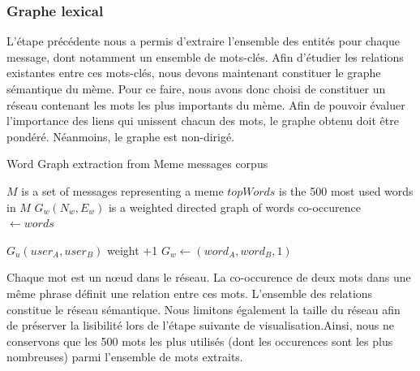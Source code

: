 \subsubsection{Graphe lexical}

    L'étape précédente nous a permis d'extraire l'ensemble des entités pour chaque message, dont notamment un ensemble de mots-clés. Afin d'étudier les relations existantes entre ces mots-clés, nous devons maintenant constituer le graphe sémantique du mème. Pour ce faire, nous avons donc choisi de constituer un réseau contenant les mots les plus importants du mème. Afin de pouvoir évaluer l'importance des liens qui unissent chacun des mots, le graphe obtenu doit être pondéré. Néanmoins, le graphe est non-dirigé.  

    \begin{algorithm}[h]
        \caption{Word Graph extraction from Meme messages corpus}
        \label{algo:meme-graph}
        \begin{algorithmic}

            \Require $M$ is a set of messages representing a meme
            \State $topWords$ is the 500 most used words in $M$
            \State $G_w(N_w,E_w)$ is a weighted directed graph of words co-occurence
            \\
                    \State {}  $ \gets words$

                                \State $G_u(user_A,user_B)$ weight +1
                            \Else
                                \State $G_w \gets (word_A,word_B, 1)$
                            \EndIf
                        \EndFor
                    \EndIf
                \EndFor
            \EndFunction
        \end{algorithmic}
    \end{algorithm}

    Chaque mot est un nœud dans le réseau. La co-occurence de deux mots dans une même phrase définit une relation entre ces mots. L{\textquoteright}ensemble des relations constitue le réseau sémantique. Nous limitons également la taille du réseau afin de préserver la lisibilité lors de l'étape suivante de visualisation.Ainsi, nous ne conservons que les 500 mots les plus utilisés (dont les occurences sont les plus nombreuses)  parmi l{\textquoteright}ensemble de mots extraits.

